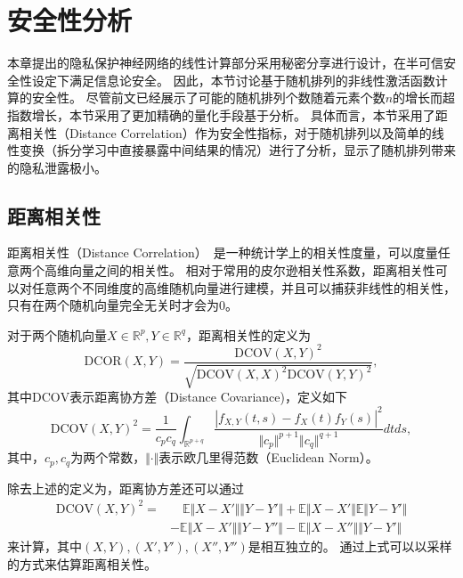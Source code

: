\section{安全性分析}
本章提出的隐私保护神经网络的线性计算部分采用秘密分享进行设计，在半可信安全性设定下满足信息论安全。
%
因此，本节讨论基于随机排列的非线性激活函数计算的安全性。
%
尽管前文已经展示了可能的随机排列个数随着元素个数$n$的增长而超指数增长，本节采用了更加精确的量化手段基于分析。
%
具体而言，本节采用了距离相关性（Distance Correlation）作为安全性指标，对于随机排列以及简单的线性变换（拆分学习中直接暴露中间结果的情况）进行了分析，显示了随机排列带来的隐私泄露极小。

\subsection{距离相关性}
距离相关性（Distance Correlation）~\cite{szekely2007dcor,szekely2009brownian_dcor}是一种统计学上的相关性度量，可以度量任意两个高维向量之间的相关性。
相对于常用的皮尔逊相关性系数，距离相关性可以对任意两个不同维度的高维随机向量进行建模，并且可以捕获非线性的相关性，只有在两个随机向量完全无关时才会为0。
%
\begin{definition}[距离相关性]
    对于两个随机向量$X \in \mathbb R^p, Y\in \mathbb R^q$，距离相关性的定义为
    \begin{equation}
        \text{DCOR}(X, Y) = \dfrac{\text{DCOV}(X, Y)^2}{\sqrt{\text{DCOV}(X, X)^2\text{DCOV}(Y, Y)^2}},
    \end{equation}
    其中$\text{DCOV}$表示距离协方差（Distance Covariance)，定义如下
    \begin{equation}
        \text{DCOV}(X, Y)^2 = \dfrac{1}{c_pc_q} \int_{\mathbb R^{p + q}}
        \dfrac{|f_{X, Y}(t, s) - f_X(t)f_Y(s)|^2}{\Vert c_p \Vert^{p+1}\Vert c_q \Vert^{q+1}}dtds,
    \end{equation}
    其中，$c_p, c_q$为两个常数，$\Vert \cdot \Vert$表示欧几里得范数（Euclidean Norm）。
\end{definition}

除去上述的定义为，距离协方差还可以通过
\begin{equation}
\begin{split}
    \text{DCOV}(X, Y)^2 = 
    & \quad \mathbb E \Vert X-X'\Vert \Vert Y -Y'\Vert +\mathbb E\Vert X -X' \Vert \mathbb E \Vert Y -Y' \Vert
    \\ & 
    - \mathbb E\Vert X-X'\Vert  \Vert Y -Y''\Vert - \mathbb E \Vert X -X''\Vert  \Vert Y -Y' \Vert
\end{split}
\end{equation}
来计算，其中$(X, Y), (X', Y'), (X'', Y'')$是相互独立的。
%
通过上式可以以采样的方式来估算距离相关性。


